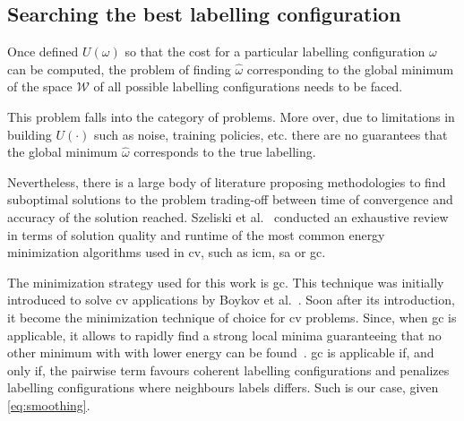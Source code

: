 
\subsection{Searching the best labelling configuration}
Once defined $U(\omega)$ so that the cost for a particular labelling configuration $\omega$ can be computed, the problem of finding $\hat{\omega}$ corresponding to the global minimum of the space $\mathcal{W}$ of all possible labelling configurations needs to be faced. 

This problem falls into the category of  problems. 
More over, due to limitations in building $U(\cdot)$ such as noise, training policies, etc. there are no guarantees that the global minimum $\hat{\omega}$ corresponds to the true labelling.

Nevertheless, there is a large body of literature proposing methodologies to find suboptimal solutions to the problem trading-off between time of convergence and accuracy of the solution reached.
Szeliski et al.~\cite{szeliski2008comparative} conducted an exhaustive review in terms of solution quality and runtime of the most common energy minimization algorithms used in \ac{cv}, such as \ac{icm}, \ac{sa} or \ac{gc}.

The minimization strategy used for this work is \ac{gc}. 
This technique was initially introduced to solve \ac{cv} applications by Boykov et al.~\cite{boykov2001fast}.
Soon after its introduction, it become the minimization technique of choice for \ac{cv} problems.
Since, when \ac{gc} is applicable, it allows to rapidly find a strong local minima guaranteeing that no other minimum with with lower energy can be found~\cite{delong2012fast}. 
\ac{gc} is applicable if, and only if, the pairwise term favours coherent labelling configurations and penalizes labelling configurations where neighbours labels differs. 
Such is our case, given \cref{eq:smoothing}.

